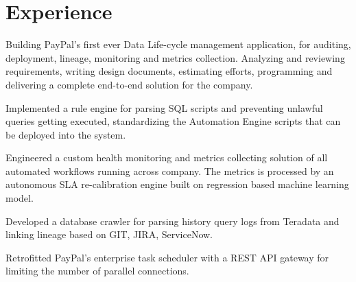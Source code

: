 \documentclass[]{kushal-resume}
\begin{document}
\hfill
\begin{minipage}[t]{0.66\textwidth}
	

\section{Experience}

\vspace{\topsep}
\begin{tightemize}\item Building PayPal's first ever Data Life-cycle management application, for auditing, deployment, lineage, monitoring and metrics collection.
Analyzing and reviewing requirements, writing design documents, estimating efforts, programming and delivering a complete end-to-end solution for the company.
\item Implemented a rule engine for parsing SQL scripts and preventing unlawful queries getting executed, standardizing the Automation Engine scripts that can be deployed into the system.
\item Engineered a custom health monitoring and metrics collecting  solution of all automated workflows running across company.
The metrics is processed by an autonomous SLA re-calibration engine built on regression based machine learning model.
\item Developed a database crawler for parsing history query logs from Teradata and linking lineage based on GIT, JIRA, ServiceNow.
\item Retrofitted PayPal's enterprise task scheduler with a REST API gateway for limiting the number of parallel connections.
\end{tightemize}
\sectionsep


\end{minipage}
\end{document}
